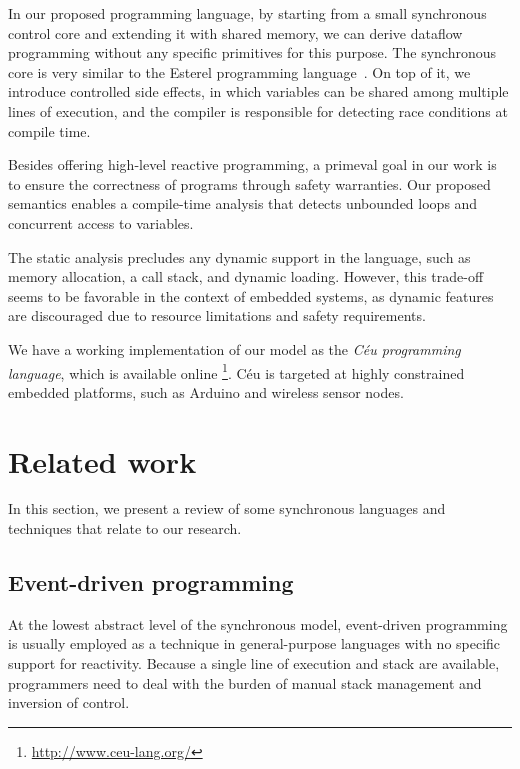 \documentclass[pdftex,12pt,a4paper]{article}
\begin{document}
In our proposed programming language, by starting from a small synchronous 
control core and extending it with shared memory, we can derive dataflow 
programming without any specific primitives for this purpose.
The synchronous core is very similar to the Esterel programming 
language~\cite{esterel.design}.
On top of it, we introduce controlled side effects, in which variables can be 
shared among multiple lines of execution, and the compiler is responsible for 
detecting race conditions at compile time.

Besides offering high-level reactive programming, a primeval goal in our work 
is to ensure the correctness of programs through safety warranties.
Our proposed semantics enables a compile-time analysis that detects unbounded 
loops and concurrent access to variables.

The static analysis precludes any dynamic support in the language, such as 
memory allocation, a call stack, and dynamic loading.
However, this trade-off seems to be favorable in the context of embedded 
systems, as dynamic features are discouraged due to resource limitations and 
safety requirements.

We have a working implementation of our model as the \emph{C\'eu
programming language}, which is available online%
\footnote{\url{http://www.ceu-lang.org/}}.
C\'eu is targeted at highly constrained embedded platforms, such as Arduino and 
wireless sensor nodes.

\section{Related work}
\label{sec:related}

In this section, we present a review of some synchronous languages and 
techniques that relate to our research.

\subsection{Event-driven programming}

At the lowest abstract level of the synchronous model, event-driven programming 
is usually employed as a technique in general-purpose languages with no 
specific support for reactivity.
Because a single line of execution and stack are available, programmers need to 
deal with the burden of manual stack management and inversion of 
control.~\cite{sync_async.cooperative}
\end{document}
